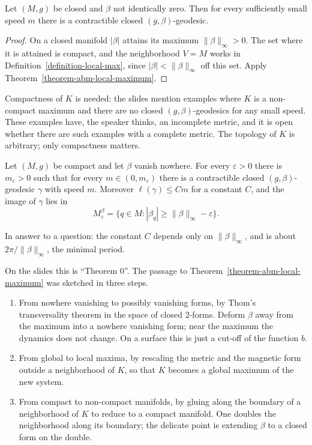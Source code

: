 \begin{corollary}
\label{corollary-abm-closed-manifold}
Let $(M,g)$ be closed and $\beta$ not
identically zero. Then for every
sufficiently small speed $m$ there is a
contractible closed $(g,\beta)$-geodesic.
\end{corollary}

\begin{proof}
On a closed manifold $|\beta|$ attains its
maximum $\|\beta\|_\infty > 0$. The set
where it is attained is compact, and the
neighborhood $V = M$ works in
Definition~\ref{definition-local-max},
since $|\beta| < \|\beta\|_\infty$ off this
set. Apply
Theorem~\ref{theorem-abm-local-maximum}.
\end{proof}

Compactness of $K$ is needed: the slides
mention examples where $K$ is a non-compact
maximum and there are no closed
$(g,\beta)$-geodesics for any small speed.
These examples have, the speaker
thinks, an incomplete metric, and it is open
whether there are such examples with a
complete metric. The topology of $K$ is
arbitrary; only compactness matters.

\begin{theorem}
\label{theorem-abm-theorem-zero}
Let $(M,g)$ be compact and let $\beta$
vanish nowhere. For every $\varepsilon > 0$
there is $m_\varepsilon > 0$ such that for
every $m \in (0,m_\varepsilon)$ there is a
contractible closed $(g,\beta)$-geodesic
$\gamma$ with speed $m$. Moreover
$\ell(\gamma) \le Cm$ for a constant $C$, and
the image of $\gamma$ lies in
$$
M^\beta_\varepsilon
= \{ q \in M :
|\beta_q| \ge \|\beta\|_\infty - \varepsilon
\}.
$$
\end{theorem}

In answer to a question: the
constant $C$ depends only on
$\|\beta\|_\infty$, and is about
$2\pi/\|\beta\|_\infty$, the minimal
period.

On the slides this is ``Theorem 0''. The
passage to
Theorem~\ref{theorem-abm-local-maximum} was
sketched in three steps.
\begin{enumerate}
\item From nowhere vanishing to possibly
vanishing forms, by Thom's transversality
theorem in the space of closed 2-forms.
Deform $\beta$ away from the
maximum into a nowhere vanishing form; near
the maximum the dynamics does not change.
On a surface this is just a cut-off of the
function $b$.
\item From global to local maxima, by
rescaling the metric and the magnetic form
outside a neighborhood of $K$, so that $K$
becomes a global maximum of the new system.
\item From compact to non-compact manifolds,
by gluing along the boundary of a
neighborhood of $K$ to reduce to a compact
manifold. One doubles the
neighborhood along its boundary; the
delicate point is extending $\beta$ to a
closed form on the double.
\end{enumerate}

